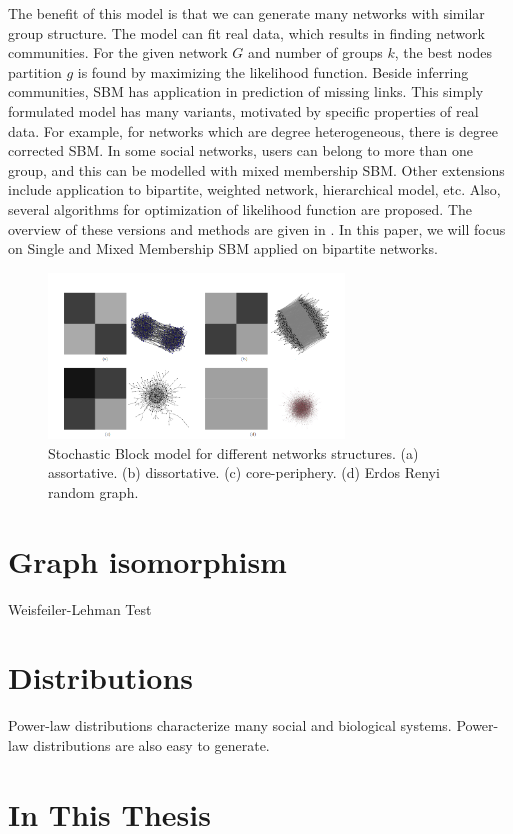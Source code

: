 The benefit of this model is that we can generate many networks with similar group structure. The model can fit real data, which results in finding network communities. For the given network $G$ and number of groups $k$, the best nodes partition $g$ is found by maximizing the likelihood function. Beside inferring communities, SBM has application in prediction of missing links. This simply formulated model has many variants, motivated by specific properties of real data. For example, for networks which are degree heterogeneous, there is degree corrected SBM. In some social networks, users can belong to more than one group, and this can be modelled with mixed membership SBM. Other extensions include application to bipartite, weighted network, hierarchical model, etc. Also, several algorithms for optimization of likelihood function are proposed. The overview of these versions and methods are given in \cite{comparison}. In this paper, we will focus on Single and Mixed Membership SBM applied on bipartite networks.  
\begin{figure}
	\centering
	\includegraphics[width=0.7\textwidth]{Figures/structures.png}
	\caption{Stochastic Block model for different networks structures. (a) assortative. (b) dissortative. (c) core-periphery. (d) Erdos Renyi random graph.}
	\label{fig:SBM}
\end{figure}

\section{Graph isomorphism}


Weisfeiler-Lehman Test

\section{Distributions}

Power-law distributions characterize many social and biological systems. Power-law distributions are also easy to generate. 

\section{In This Thesis}


